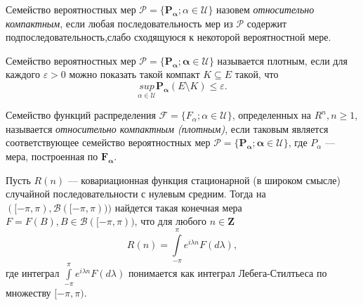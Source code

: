 \begin{definition}
    Семейство вероятностных мер $\mathcal{P} = \{ \mathbf{P_{\alpha}}; \alpha \in \mathcal{U} \}$ назовем \textit{относительно компактным}, если любая последовательность мер из $\mathcal{P}$ содержит подпоследовательность,слабо сходящуюся к некоторой вероятностной мере.
\end{definition}

\begin{definition}
    Семейство вероятностных мер $\mathcal{P} = \{ \mathbf{P_{\alpha}; \alpha \in \mathcal{U} }\}$ называется плотным, если для каждого $\varepsilon > 0$ можно показать такой компакт $K \subseteq E$ такой, что 
    $$ \underset{\alpha \in \mathcal{U}}{sup} \mathbf{P_{\alpha}} (E \setminus K ) 	\leq \varepsilon.$$
\end{definition}

\begin{definition}
    Семейство функций распределения $\mathcal{F} = \{ F_{\alpha} ; \alpha \in \mathcal{U} \}$, определенных на $R^n, n \geq 1$, называется \textit{относительно компактным (плотным)}, если таковым является соответствующее семейство вероятностных мер $\mathcal{P} = \{ \mathbf{P_{\alpha}; \alpha \in \mathcal{U}} \}$, где $P_{\alpha}$ --- мера, построенная по $\mathbf{F_{\alpha}}$.
\end{definition}

\begin{theorem}[Герглотц]
Пусть $R(n)$ –– ковариационная функция
стационарной (в широком смысле) случайной последовательности
с нулевым средним. Тогда на $([-\pi, \pi), \mathcal{B}([ -\pi, \pi)))$ найдется такая конечная мера $F=F(B), B \in \mathcal{B}([ -\pi, \pi))$, что для любого $n \in \mathbf{Z}$
\begin{equation}\label{eq9} 
    R(n)= \int\limits_{-\pi}^{\pi} e^{i\lambda n} F(d \lambda),
\end{equation}
где интеграл $\int\limits_{-\pi}^{\pi} e^{i\lambda n} F(d \lambda)$ понимается как интеграл Лебега-Стилтьеса по множеству $[-\pi, \pi)$.
\end{theorem}

